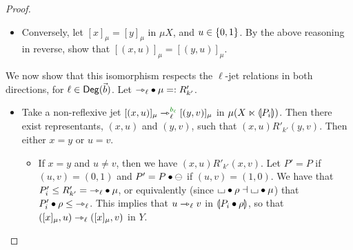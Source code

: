 \documentclass[a4paper]{memoir}
\begin{document}
\begin{proof}
\begin{enumerate}
\begin{itemize}
			\item[\framebox{$\leftarrow$}]
			Conversely, let $[x]_\mu = [y]_\mu$ in $\mu X$, and $u \in \mathopen{}\left\{ 0, 1 \right\}\mathclose{}$.
			By the above reasoning in reverse, show that $[(x, u)]_\mu = [(y, u)]_\mu$.	
		\end{itemize}
		We now show that this isomorphism respects the $\ell$-jet relations in both directions, for $\ell \in {\mathsf{Deg}}(\vec b)$.
		Let ${\rightarrowtriangle}_\ell \mathbin{\bullet} \mu =: R'_{k'}$.
		\begin{itemize}
			\item[\framebox{$\to$}]
			Take a non-reflexive jet $[(x, u)]_\mu \jet_\ell\pmr{b_\ell} [(y, v)]_\mu$ in $\mu(X \ltimes {\llparenthesis P_i \rrparenthesis})$.
			Then there exist representants, \WLOG{} $(x, u)$ and $(y, v)$, such that $(x, u) \mathrel{R'_{k'}} (y, v)$.
			Then either $x = y$ or $u = v$.
			\begin{itemize}
				\item If $x = y$ and $u \neq v$, then we have $(x, u) \mathrel{R'_{k'}} (x, v)$.
				Let $P' = P$ if $(u, v) = (0, 1)$ and $P' = P \mathbin{\bullet} {\ominus}$ if $(u, v) = (1, 0)$.
				We have that $P'_i \leq R'_{k'} = {\rightarrowtriangle}_\ell \mathbin{\bullet} \mu$, or equivalently (since ${\llcorner\hspace{-.4ex}\lrcorner} \mathbin{\bullet} \rho \dashv {\llcorner\hspace{-.4ex}\lrcorner} \mathbin{\bullet} \mu$) that $P'_i \mathbin{\bullet} \rho \leq {\rightarrowtriangle}_\ell$.
				This implies that $u \rightarrowtriangle_\ell v$ in ${\llparenthesis P_i \mathbin{\bullet} \rho \rrparenthesis}$, so that $([x]_\mu, u) \rightarrowtriangle_\ell ([x]_\mu, v)$ in $Y$.
				

\end{itemize}
\end{itemize}
\end{enumerate}
\end{proof}
\end{document}
